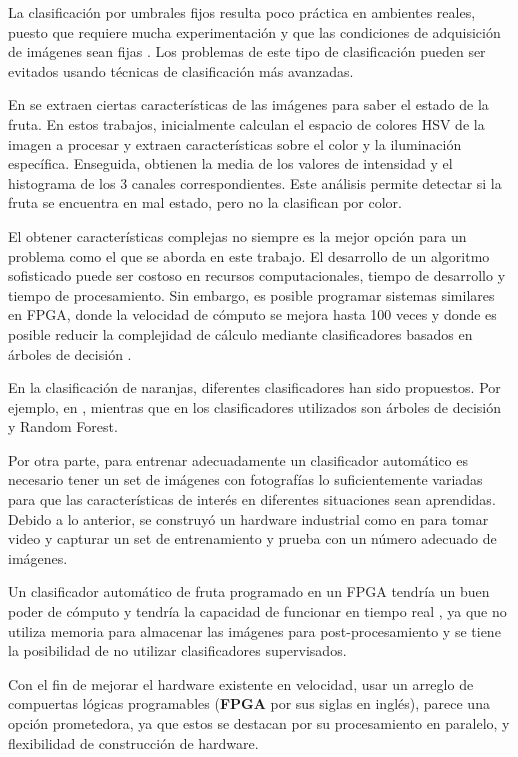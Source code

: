 \documentclass[twoside,spanish,ESP,MSc]{plantillaLabUPV}
\theoremstyle{definition}
\begin{document}
La clasificación por umbrales fijos resulta poco práctica en ambientes reales, puesto que requiere mucha experimentación y que las condiciones de adquisición de imágenes sean fijas \cite{huehue,josu}. Los problemas de este tipo de clasificación pueden ser evitados usando técnicas de clasificación más avanzadas.

En \cite{analis,chokun} se extraen ciertas características de las imágenes para saber el estado de la fruta. En estos trabajos, inicialmente calculan el espacio de colores HSV de la imagen a procesar y extraen características sobre el color y la iluminación específica. Enseguida, obtienen la media de los valores de intensidad y el histograma de los 3 canales correspondientes. Este análisis permite detectar si la fruta se encuentra en mal estado, pero no la clasifican por color.

El obtener características complejas no siempre es la mejor opción para un problema como el que se aborda en este trabajo. El desarrollo de un algoritmo sofisticado puede ser costoso en recursos computacionales, tiempo de desarrollo y tiempo de procesamiento\cite{khoje}. Sin embargo, es posible programar sistemas similares en FPGA, donde la velocidad de cómputo se mejora hasta 100 veces \cite{faste} y donde es posible reducir la complejidad de cálculo mediante clasificadores basados en árboles de decisión \cite{friend}.

En la clasificación de naranjas, diferentes clasificadores han sido propuestos. Por ejemplo, en \cite{classi,analis}, mientras que en \cite{analis,rfrf} los clasificadores utilizados son árboles de decisión y Random Forest. 

Por otra parte, para entrenar adecuadamente un clasificador automático es necesario tener un set de imágenes con fotografías lo suficientemente variadas para que las características de interés en diferentes situaciones sean aprendidas. Debido a lo anterior, se construyó un hardware industrial como en \cite{machineorang,machinefruit} para tomar video y capturar un set de entrenamiento y prueba con un número adecuado de imágenes.

Un clasificador automático de fruta programado en un FPGA tendría un buen poder de cómputo y tendría la capacidad de funcionar en tiempo real \cite{josu}, ya que no utiliza memoria para almacenar las imágenes para post-procesamiento y se tiene la posibilidad de no utilizar clasificadores supervisados.

Con el fin de mejorar el hardware existente en velocidad, usar un arreglo de compuertas lógicas programables (\textbf{FPGA} por sus siglas en inglés), parece una opción prometedora, ya que estos se destacan por su procesamiento en paralelo, y flexibilidad de construcción de hardware.
\end{document}
